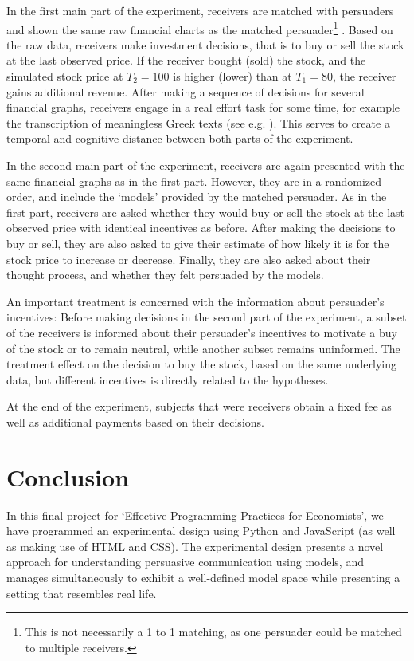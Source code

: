 \documentclass[11pt, a4paper, leqno]{article}
\begin{document}
In the first main part of the experiment, receivers are matched with persuaders and shown the same raw financial charts as the matched persuader\footnote{ This is not necessarily a 1 to 1 matching, as one persuader could be matched to multiple receivers.} . Based on the raw data, receivers make investment decisions, that is to buy or sell the stock at the last observed price. If the receiver bought (sold) the stock, and the simulated stock price at $T_2=100$ is higher (lower) than at $T_1=80$, the receiver gains additional revenue. After making a sequence of decisions for several financial graphs, receivers engage in a real effort task for some time, for example the transcription of meaningless Greek texts (see e.g. \cite{Augenblick}). This serves to create a temporal and cognitive distance between both parts of the experiment.

In the second main part of the experiment, receivers are again presented with the same financial graphs as in the first part. However, they are in a randomized order, and include the `models' provided by the matched persuader. As in the first part, receivers are asked whether they would buy or sell the stock at the last observed price with identical incentives as before. After making the decisions to buy or sell, they are also asked to give their estimate of how likely it is for the stock price to increase or decrease. Finally, they are also asked about their thought process, and whether they felt persuaded by the models.

An important treatment is concerned with the information about persuader's incentives: Before making decisions in the second part of the experiment, a subset of the receivers is informed about their persuader's incentives to motivate a buy of the stock or to remain neutral, while another subset remains uninformed. The treatment effect on the decision to buy the stock, based on the same underlying data, but different incentives is directly related to the hypotheses.

At the end of the experiment, subjects that were receivers obtain a fixed fee as well as additional payments based on their decisions.



\section{Conclusion}

In this final project for `Effective Programming Practices for Economists', we have programmed an experimental design using Python and JavaScript (as well as making use of HTML and CSS). The experimental design presents a novel approach for understanding persuasive communication using models, and manages simultaneously to exhibit a well-defined model space while presenting a setting that resembles real life.
\end{document}
